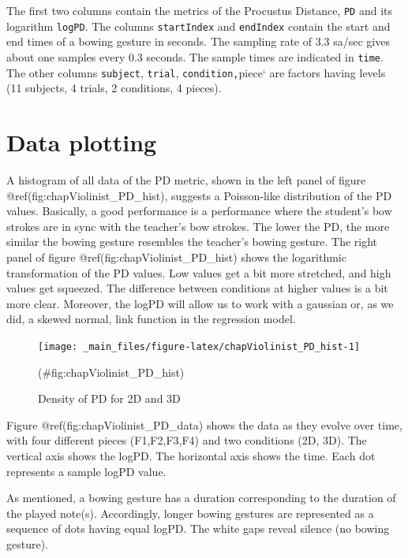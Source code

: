 \documentclass[
]{book}
\theoremstyle{definition}
\theoremstyle{definition}
\theoremstyle{definition}
\theoremstyle{definition}
\theoremstyle{remark}
\begin{document}
The first two columns contain the metrics of the Procustus Distance, \texttt{PD} and its logarithm \texttt{logPD}.
The columns \texttt{startIndex} and \texttt{endIndex} contain the start and end times of a bowing gesture in seconds.
The sampling rate of 3.3 sa/sec gives about one samples every 0.3 seconds.
The sample times are indicated in \texttt{time}.
The other columns \texttt{subject}, \texttt{trial}, \texttt{condition\textasciigrave{}\textasciigrave{},}piece` are factors having levels (11 subjects, 4 trials, 2 conditions, 4 pieces).

\hypertarget{data-plotting}{%
\section{Data plotting}\label{data-plotting}}

A histogram of all data of the PD metric, shown in the left panel of figure @ref(fig:chapViolinist\_PD\_hist), suggests a Poisson-like distribution of the PD values.
Basically, a good performance is a performance where the student's bow strokes are in sync with the teacher's bow strokes. The lower the PD, the more similar the bowing gesture resembles the teacher's bowing gesture. The right panel of figure @ref(fig:chapViolinist\_PD\_hist) shows the logarithmic transformation of the PD values. Low values get a bit more stretched, and high values get squeezed. The difference between conditions at higher values is a bit more clear. Moreover, the logPD will allow us to work with a gaussian or, as we did, a skewed normal, link function in the regression model.

\begin{figure}

{\centering \texttt{[image: \_main\_files/figure-latex/chapViolinist\_PD\_hist-1]} 

}

\caption{Density of PD for 2D and 3D}(\#fig:chapViolinist_PD_hist)
\end{figure}

Figure @ref(fig:chapViolinist\_PD\_data) shows the data as they evolve over time, with four different pieces (F1,F2,F3,F4) and two conditions (2D, 3D).
The vertical axis shows the logPD.
The horizontal axis shows the time.
Each dot represents a sample logPD value.

As mentioned, a bowing gesture has a duration corresponding to the duration of the played note(s). Accordingly, longer bowing gestures are represented as a sequence of dots having equal logPD.
The white gaps reveal silence (no bowing gesture).
\end{document}
